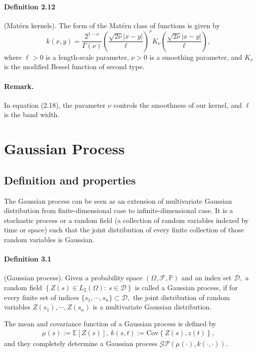 \documentclass{article}
\begin{document}
\paragraph{Definition 2.12} (Matérn kernels). The form of the Matérn class of functions is given by
\begin{equation*}
	k(x,y) = \frac{2^{1-\nu}}{\Gamma(\nu)}\left(\frac{\sqrt{2\nu}\vert x-y\vert}{\ell}\right)^\nu K_\nu\left(\frac{\sqrt{2\nu}\vert x-y\vert}{\ell}\right),\tag{2.18}
\end{equation*}
where $\ell > 0$ is a length-scale parameter, $\nu > 0$ is a smoothing parameter, and $K_\nu$ is the modified Bessel function of second type.

\paragraph{Remark.} In equation (2.18), the parameter $\nu$ controls the smoothness of our kernel, and $\ell$ is the band width.

\newpage

\section{Gaussian Process}
\subsection{Definition and properties}
The Gaussian process can be seen as an extension of multivariate Gaussian distribution from finite-dimensional case to infinite-dimensional case. It is a stochastic process or a random field (a collection of random variables indexed by time or space) such that the joint distribution of every finite collection of those random variables is Gaussian.
\paragraph{Definition 3.1} (Gaussian process). Given a probability space $(\Omega,\mathcal{F},\mathbb{P})$ and an index set $\mathcal{D},$ a random field $\left\lbrace Z(s)\in L_2(\Omega):\ s\in\mathcal{D}\right\rbrace$ is called a Gaussian process, if for every finite set of indices $\lbrace s_1,\cdots,s_n\rbrace \subset \mathcal{D},$ the joint distribution of random variables $Z(s_1),\cdots,Z(s_n)$ is a multivariate Gaussian distribution.

The mean and covariance function of a Gaussian process is defined by
\begin{align*}
	\mu(s):=\mathbb{E}[Z(s)],\ k(s,t):=\mathrm{Cov}\left\lbrace Z(s),z(t)\right\rbrace,\tag{3.1}
\end{align*}
and they completely determine a Gaussian process $\mathcal{GP}\left(\mu(\cdot),k(\cdot,\cdot)\right).$
\end{document}
